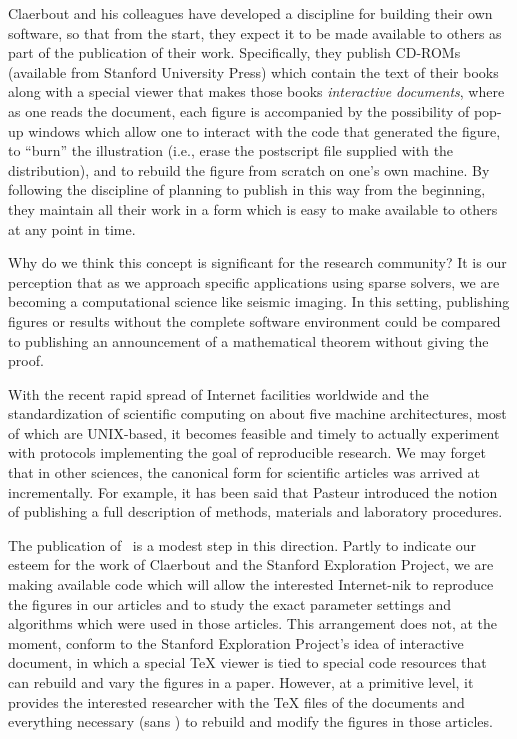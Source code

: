 \documentclass{article}
\begin{document}
Claerbout and his colleagues have developed a discipline for building their own software, so that
from the start, they expect it to be made available to others as part of the publication of their
work.  Specifically, they publish CD-ROMs (available from Stanford University Press) which contain
the text of their books along with a special viewer that makes those books {\it interactive
documents}, where as one reads the document, each figure is accompanied by the possibility of
pop-up windows which allow one to interact with the code that generated the figure, to ``burn'' the
illustration (i.e., erase the postscript  file supplied with the distribution),  and to rebuild the
figure from scratch on one's own machine.  By following the discipline of planning to  publish in
this way from the beginning, they maintain all their work  in a form which is easy to make
available to others at any point in time.

Why do we think this concept is significant for the research community? It is our perception that
as we approach specific applications using sparse solvers, we are becoming a computational science
like seismic imaging. In this setting, publishing figures or results without the complete software
environment could be compared to publishing an announcement of a mathematical theorem without
giving the proof.

With the recent rapid spread of Internet facilities worldwide and the standardization of scientific
computing on about five machine architectures, most of which are UNIX-based, it becomes feasible
and timely to actually experiment with protocols implementing the goal of reproducible research. We
may forget that in other sciences, the canonical form for scientific articles was arrived at
incrementally. For example, it has been said  that Pasteur introduced the notion of publishing a
full description of methods, materials and laboratory procedures.

The publication of \WaveLab\ is a modest step in this direction. Partly to indicate our esteem for
the work of Claerbout and the Stanford Exploration Project, we are making available code which will
allow the interested Internet-nik to reproduce the figures in our articles and to study the exact
parameter settings and algorithms which were used in those articles. This arrangement does not, at
the moment, conform to the Stanford Exploration Project's idea of interactive document, in which a
special TeX viewer is tied to special code resources that can rebuild and vary the figures in a
paper. However, at a primitive level, it provides the interested researcher with the TeX files of
the documents and everything necessary (sans \Matlab) to rebuild and modify the figures in those
articles.
\end{document}
